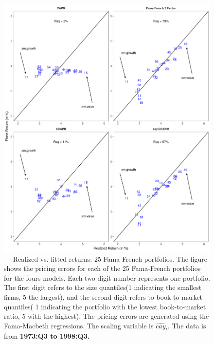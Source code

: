 \documentclass[12pt]{article}
\begin{document}
\begin{figure}[htbp]
\begin{center}
\includegraphics[scale=0.6]{fig1.pdf}
\caption{--- Realized vs. fitted returns: 25 Fama-French portfolios. The figure shows the pricing errors for each of the 25 Fama-French portfolios for the fours models. Each two-digit number represents one portfolio. The first digit refers to the size quantiles(1 indicating the smallest firms, 5 the largest), and the second digit refers to book-to-market quantiles( 1 indicating the portfolio with the lowest book-to-market ratio, 5 with the highest). The pricing errors are generated using the Fama-Macbeth regressions. The scaling variable is $\widehat{cay}_t$. The data is from \bf{1973:Q3 to 1998:Q3.} }
\label{fig:old}
\end{center}
\end{figure}
\end{document}
